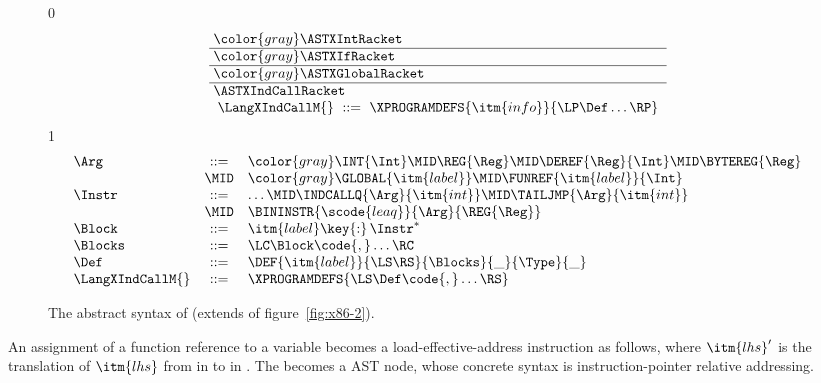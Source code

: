 \documentclass[7x10]{TimesAPriori_MIT}%
\newcommand{\gray}[1]{{\color{gray} #1}}
\def\racketEd{0}
\def\pythonEd{1}
\def\edition{0}
\numberwithin{theorem}{chapter}
\numberwithin{definition}{chapter}
\numberwithin{equation}{chapter}
\begin{document}
\begin{figure}[tp]
  \begin{tcolorbox}[colback=white]
    \small
{\if\edition\racketEd
\[\arraycolsep=3pt
\begin{array}{l}
  \gray{\ASTXIntRacket} \\ \hline
  \gray{\ASTXIfRacket} \\ \hline
  \gray{\ASTXGlobalRacket} \\ \hline
  \ASTXIndCallRacket \\
\begin{array}{lcl}
\LangXIndCallM{} &::= & \XPROGRAMDEFS{\itm{info}}{\LP\Def\ldots\RP}
\end{array}
\end{array}
\]
\fi}
{\if\edition\pythonEd
\[
\begin{array}{lcl}
  \Arg &::=&  \gray{  \INT{\Int} \MID \REG{\Reg} \MID \DEREF{\Reg}{\Int}
     \MID \BYTEREG{\Reg} } \\
     &\MID& \gray{ \GLOBAL{\itm{label}} } \MID \FUNREF{\itm{label}}{\Int} \\
  \Instr &::=& \ldots \MID \INDCALLQ{\Arg}{\itm{int}}
    \MID \TAILJMP{\Arg}{\itm{int}}\\
    &\MID& \BININSTR{\scode{leaq}}{\Arg}{\REG{\Reg}}\\
  \Block &::=&\itm{label}\key{:}\,\Instr^{*} \\
  \Blocks &::= & \LC\Block\code{,}\ldots\RC\\
  \Def &::= & \DEF{\itm{label}}{\LS\RS}{\Blocks}{\_}{\Type}{\_} \\
\LangXIndCallM{} &::= & \XPROGRAMDEFS{\LS\Def\code{,}\ldots\RS}
\end{array}
\]
\fi}
  \end{tcolorbox}
\caption{The abstract syntax of \LangXIndCall{} (extends
  \LangXGlobal{} of figure~\ref{fig:x86-2}).}
\label{fig:x86-3}
\end{figure}

An assignment of a function reference to a variable becomes a
load-effective-address instruction as follows, where $\itm{lhs}'$ is
the translation of $\itm{lhs}$ from \Atm{} in \LangCFun{} to \Arg{} in
\LangXIndCallVar{}. The  becomes a  AST
node, whose concrete syntax is instruction-pointer relative
addressing.
\end{document}
